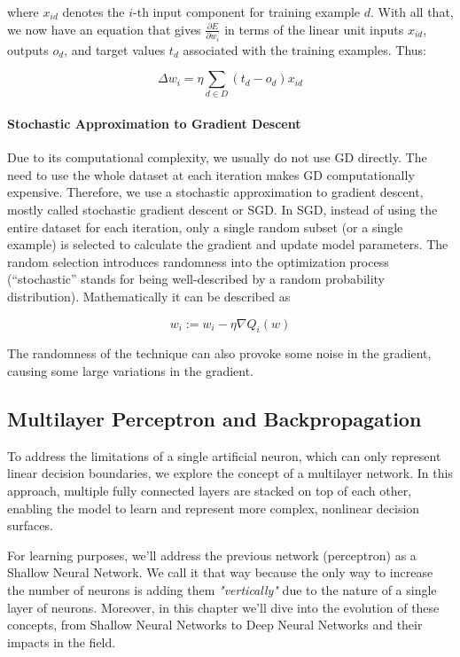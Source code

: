 \documentclass{tufte-handout}
\begin{document}
where $x_{id}$ denotes the $i$-th input component for training example $d$. With all that, we now have an equation that gives $\frac{\partial E}{\partial w_i}$ in terms of the linear unit inputs $x_{id}$, outputs $o_d$, and target values $t_d$ associated with the training examples. Thus:

\begin{equation}
    \Delta w_i = \eta \sum_{d \in D} (t_d - o_d)x_{id}
\end{equation}

\paragraph{Stochastic Approximation to Gradient Descent}
Due to its computational complexity, we usually do not use GD directly. The need to use the whole dataset at each iteration makes GD computationally expensive. Therefore, we use a stochastic approximation to gradient descent, mostly called stochastic gradient descent or SGD.
In SGD, instead of using the entire dataset for each iteration, only a single random subset (or a single example) is selected to calculate the gradient and update model parameters. The random selection introduces randomness into the optimization process (“stochastic” stands for being well-described by a random probability distribution). Mathematically it can be described as

\begin{equation}
    w_i := w_i - \eta \nabla Q_i (w)
\end{equation}

The randomness of the technique can also provoke some noise in the gradient, causing some large variations in the gradient.

\subsection{Multilayer Perceptron and Backpropagation}
To address the limitations of a single artificial neuron, which can only represent linear decision boundaries, we explore the concept of a multilayer network. In this approach, multiple fully connected layers are stacked on top of each other, enabling the model to learn and represent more complex, nonlinear decision surfaces.

For learning purposes, we'll address the previous network (perceptron) as a Shallow Neural Network. We call it that way because the only way to increase the number of neurons is adding them \textit{"vertically"} due to the nature of a single layer of neurons. Moreover, in this chapter we'll dive into the evolution of these concepts, from Shallow Neural Networks to Deep Neural Networks and their impacts in the field.
\end{document}
